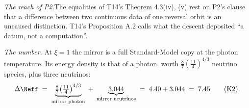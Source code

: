 \textit{The reach of P2.}\enspace The equalities of T14's Theorem 4.3(iv), (v) rest on P2's clause that a difference between two continuous data of one reversal orbit is an uncaused distinction. T14's Proposition A.2 calls what the descent deposited ``a datum, not a computation''.



\emph{The number.}  At $\xi = 1$ the mirror is a full Standard-Model copy at the photon temperature. Its energy density is that of a photon, worth $\tfrac{8}{7}(\tfrac{11}{4})^{4/3}$ neutrino species, plus three neutrinos:
\[
\Delta\Neff \;=\; \underbrace{\tfrac{8}{7}\bigl(\tfrac{11}{4}\bigr)^{4/3}}_{\text{mirror photon}} \;+\; \underbrace{3.044}_{\text{mirror neutrinos}} \;=\; 4.40 + 3.044 \;=\; 7.45 \qquad \text{(K2)}.
\]
